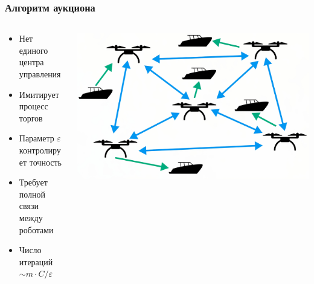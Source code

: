 \documentclass{beamer}
\begin{document}
	\begin{frame}
	    \frametitle{Алгоритм аукциона}
	    \begin{columns}[T]
	        \begin{column}{0.6\textwidth}
	            \begin{itemize}
	                \item Нет единого центра управления
	                \item Имитирует процесс торгов
	                \item Параметр \(\varepsilon\) контролирует точность
	                \item Требует полной связи между роботами
	                \item Число итераций $\sim m\cdot C/$\(\varepsilon\)
	            \end{itemize}
	        \end{column}
	        \begin{column}{0.4\textwidth}
	            \hspace*{-1cm} %
	            \includegraphics[width=1.2\textwidth,height=0.85\textheight,keepaspectratio]{mrta3.jpeg}
	        \end{column}
	    \end{columns}
	\end{frame}
\end{document}
